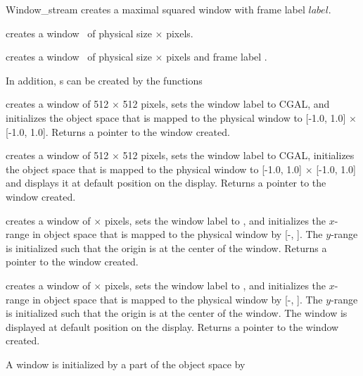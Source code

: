 \begin{ccClass} {Window_stream}
{creates a maximal squared window with frame label $label$.}

{creates a window \ccVar\ of physical size  $\times$  pixels.}


{creates a window \ccVar\ of physical size  $\times$  pixels 
and frame label .}

In addition, \ccClassName s can be created by the functions

{creates a window of 512 $\times$ 512 pixels, sets the window label to
CGAL, and  initializes the object space that is mapped to the physical window to
[-1.0, 1.0] $\times$ [-1.0, 1.0]. 
Returns a pointer to the window created.}

{creates a window of 512 $\times$ 512 pixels, sets the window label to
CGAL, initializes the object space that is mapped to the physical window to 
[-1.0, 1.0] $\times$ [-1.0, 1.0] and 
displays it at default position on the display. Returns a pointer to the window created.}

{creates a window of  $\times$  pixels, sets the window label to
, and  initializes the $x$-range in object space that is mapped to the physical window by
[-, ]. The $y$-range is initialized such that the origin is at
the center of the window. 
Returns a pointer to the window created.}

{creates a window of  $\times$  pixels, sets the window label to
, and initializes the $x$-range in object space that is mapped to the physical window by
[-, ]. The $y$-range is initialized such that the origin is at
the center of the window. The window is displayed at default position on the display. 
Returns a pointer to the window created.}

\ccOperations
A window is initialized by a part of the object space by


\end{ccClass}
